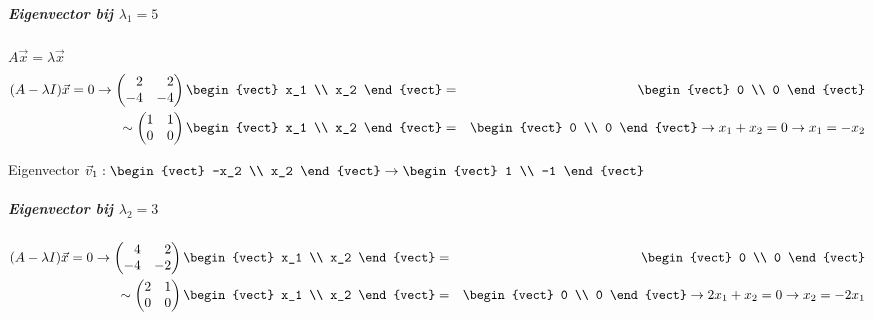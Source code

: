 \subparagraph{Eigenvector bij $\lambda_1=5$}
$A \vec{x} = \lambda \vec{x}$
\begin{eqnarray*}
	(A - \lambda I) \vec{x} = 0 \to \begin{pmatrix*}[r] 2 & 2 \\ -4 & -4 \end{pmatrix*} \begin{vect} x_1 \\ x_2 \end{vect} &=& \begin{vect} 0 \\ 0 \end{vect} \\
	\sim \begin{pmatrix} 1 & 1 \\ 0 & 0 \end{pmatrix} \begin{vect} x_1 \\ x_2 \end{vect} &=& \begin{vect} 0 \\ 0 \end{vect} \to x_1 + x_2 = 0 \to x_1 = -x_2
\end{eqnarray*}

Eigenvector $\vec{v}_1: \begin{vect} -x_2 \\ x_2 \end{vect} \to \begin{vect} 1 \\ -1 \end{vect}$

\subparagraph{Eigenvector bij $\lambda_2 = 3$}
\begin{eqnarray*}
	(A - \lambda I) \vec{x} = 0 \to \begin{pmatrix*}[r] 4 & 2 \\ -4 & -2 \end{pmatrix*} \begin{vect} x_1 \\ x_2 \end{vect} &=& \begin{vect} 0 \\ 0 \end{vect} \\
	\sim \begin{pmatrix} 2 & 1 \\ 0 & 0 \end{pmatrix} \begin{vect} x_1 \\ x_2 \end{vect} &=& \begin{vect} 0 \\ 0 \end{vect} \to 2x_1 + x_2 = 0 \to x_2 = -2x_1
\end{eqnarray*}

